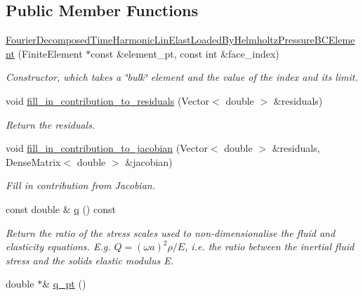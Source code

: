 \subsection*{Public Member Functions}
\begin{DoxyCompactItemize}
\item 
\hyperlink{classoomph_1_1FourierDecomposedTimeHarmonicLinElastLoadedByHelmholtzPressureBCElement_aebbd02ebb45634d3e853669d7b37b6f3}{Fourier\+Decomposed\+Time\+Harmonic\+Lin\+Elast\+Loaded\+By\+Helmholtz\+Pressure\+B\+C\+Element} (Finite\+Element $\ast$const \&element\+\_\+pt, const int \&face\+\_\+index)
\begin{DoxyCompactList}\small\item\em Constructor, which takes a \char`\"{}bulk\char`\"{} element and the value of the index and its limit. \end{DoxyCompactList}\item 
void \hyperlink{classoomph_1_1FourierDecomposedTimeHarmonicLinElastLoadedByHelmholtzPressureBCElement_abf7b85b20e0a028a0179a64ad97acf1e}{fill\+\_\+in\+\_\+contribution\+\_\+to\+\_\+residuals} (Vector$<$ double $>$ \&residuals)
\begin{DoxyCompactList}\small\item\em Return the residuals. \end{DoxyCompactList}\item 
void \hyperlink{classoomph_1_1FourierDecomposedTimeHarmonicLinElastLoadedByHelmholtzPressureBCElement_ac5f6369682a12573e07f07651ffb2a5f}{fill\+\_\+in\+\_\+contribution\+\_\+to\+\_\+jacobian} (Vector$<$ double $>$ \&residuals, Dense\+Matrix$<$ double $>$ \&jacobian)
\begin{DoxyCompactList}\small\item\em Fill in contribution from Jacobian. \end{DoxyCompactList}\item 
const double \& \hyperlink{classoomph_1_1FourierDecomposedTimeHarmonicLinElastLoadedByHelmholtzPressureBCElement_a874a6bc7470c0ba4de2b39f8444ed4e2}{q} () const
\begin{DoxyCompactList}\small\item\em Return the ratio of the stress scales used to non-\/dimensionalise the fluid and elasticity equations. E.\+g. $ Q = (\omega a)^2 \rho/E $, i.\+e. the ratio between the inertial fluid stress and the solid\textquotesingle{}s elastic modulus E. \end{DoxyCompactList}\item 
double $\ast$\& \hyperlink{classoomph_1_1FourierDecomposedTimeHarmonicLinElastLoadedByHelmholtzPressureBCElement_a3495996a8cdf7bb6e5ff5e3d9dcafa7e}{q\+\_\+pt} ()

\end{DoxyCompactItemize}
